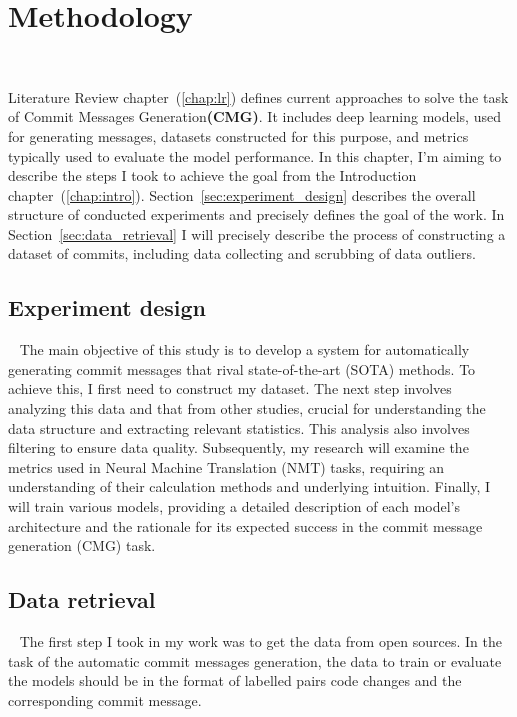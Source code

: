 \chapter{Methodology}~\label{chap:met}

Literature Review chapter~(\ref{chap:lr}) defines current approaches to solve the task of Commit Messages Generation\textbf{(CMG)}. It includes deep learning models, used for generating messages, datasets constructed for this purpose, and metrics typically used to evaluate the model performance. In this chapter, I'm aiming to describe the steps I took to achieve the goal from the Introduction chapter~(\ref{chap:intro}). Section~\ref{sec:experiment_design} describes the overall structure of conducted experiments and precisely defines the goal of the work. In Section~\ref{sec:data_retrieval} I will precisely describe the process of constructing a dataset of commits, including data collecting and scrubbing of data outliers.

\section{Experiment design}~\label{sec:experiment_design}
The main objective of this study is to develop a system for automatically generating commit messages that rival state-of-the-art (SOTA) methods. To achieve this, I first need to construct my dataset. The next step involves analyzing this data and that from other studies, crucial for understanding the data structure and extracting relevant statistics. This analysis also involves filtering to ensure data quality. Subsequently, my research will examine the metrics used in Neural Machine Translation (NMT) tasks, requiring an understanding of their calculation methods and underlying intuition. Finally, I will train various models, providing a detailed description of each model's architecture and the rationale for its expected success in the commit message generation (CMG) task.

\section{Data retrieval}~\label{sec:data_retrieval}
The first step I took in my work was to get the data from open sources. In the task of the automatic commit messages generation, the data to train or evaluate the models should be in the format of labelled pairs code changes and the corresponding commit message.
